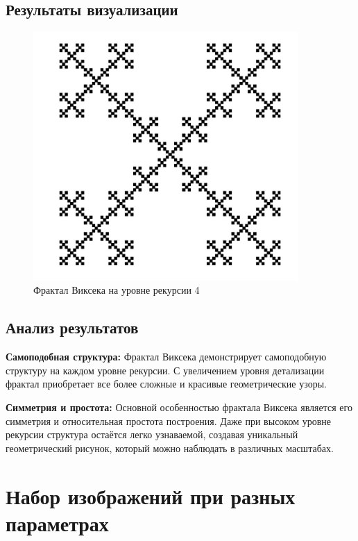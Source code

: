 \documentclass{article}
\begin{document}
	\subsection{Результаты визуализации}
	\begin{figure}[H]
		\centering
		\includegraphics[width=0.9\textwidth]{images/screenshot_vicsek}
		\caption{Фрактал Виксека на уровне рекурсии 4}
		\label{fig}
	\end{figure}
	
	\subsection{Анализ результатов}
	\textbf{Самоподобная структура:} Фрактал Виксека демонстрирует самоподобную структуру на каждом уровне рекурсии. С увеличением уровня детализации фрактал приобретает все более сложные и красивые геометрические узоры.
	
	\textbf{Симметрия и простота:} Основной особенностью фрактала Виксека является его симметрия и относительная простота построения. Даже при высоком уровне рекурсии структура остаётся легко узнаваемой, создавая уникальный геометрический рисунок, который можно наблюдать в различных масштабах.
	
	\newpage
	
	\section{Набор изображений при разных параметрах}
	
\end{document}
